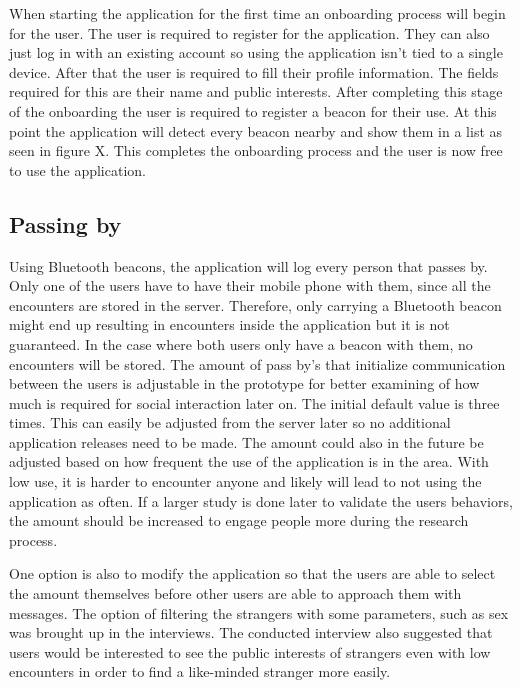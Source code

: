 When starting the application for the first time an onboarding process will begin for the user. The user is required to register for the application. They can also just log in with an existing account so using the application isn't tied to a single device. After that the user is required to fill their profile information. The fields required for this are their name and public interests. After completing this stage of the onboarding the user is required to register a beacon for their use. At this point the application will detect every beacon nearby and show them in a list as seen in figure X. This completes the onboarding process and the user is now free to use the application.

\subsection{Passing by}

Using Bluetooth beacons, the application will log every person that passes by. Only one of the users have to have their mobile phone with them, since all the encounters are stored in the server. Therefore, only carrying a Bluetooth beacon might end up resulting in encounters inside the application but it is not guaranteed. In the case where both users only have a beacon with them, no encounters will be stored. The amount of pass by's that initialize communication between the users is adjustable in the prototype for better examining of how much is required for social interaction later on. The initial default value is three times. This can easily be adjusted from the server later so no additional application releases need to be made. The amount could also in the future be adjusted based on how frequent the use of the application is in the area. With low use, it is harder to encounter anyone and likely will lead to not using the application as often. If a larger study is done later to validate the users behaviors, the amount should be increased to engage people more during the research process.

One option is also to modify the application so that the users are able to select the amount themselves before other users are able to approach them with messages. The option of filtering the strangers with some parameters, such as sex was brought up in the interviews. The conducted interview also suggested that users would be interested to see the public interests of strangers even with low encounters in order to find a like-minded stranger more easily.

